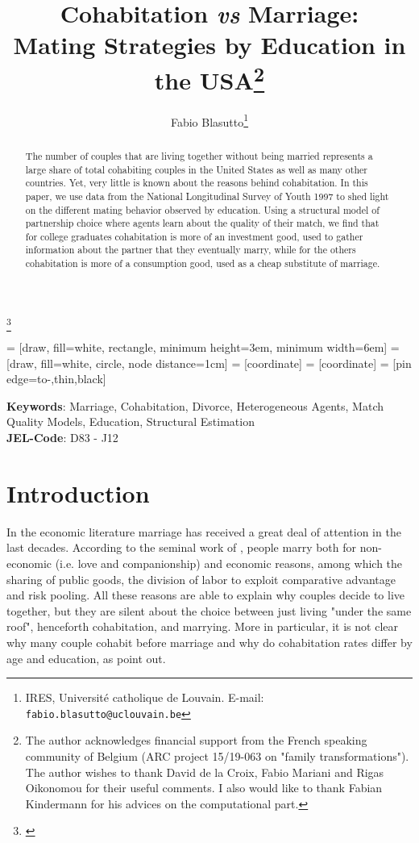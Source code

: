 \documentclass[12pt]{article}
\title{Cohabitation \textit{vs} Marriage:\\ Mating Strategies by Education in the USA\thanks{The author acknowledges financial support from the French speaking community of Belgium (ARC project 15/19-063 on "family transformations"). The author wishes to thank David de la Croix, Fabio Mariani and Rigas Oikonomou for their useful comments. I also would like to thank Fabian Kindermann for his advices on the computational part.}}
\author{Fabio Blasutto\thanks{IRES, Université catholique de Louvain. E-mail: \tt{fabio.blasutto@uclouvain.be}}}
\begin{document}
 \begin{spacing}{1.5}
 \lipsum*[1]\footnote{\begin{spacing}{1.5}\lipsum[1]\end{spacing}}
\end{spacing}
 	 = [draw, fill=white, rectangle, 
 	minimum height=3em, minimum width=6em]
 	 = [draw, fill=white, circle, node distance=1cm]
 	 = [coordinate]
 	 = [coordinate]
 	 = [pin edge={to-,thin,black}]
 	



	\maketitle
\begin{abstract}
The number of couples that are living together without being married represents a large share of total cohabiting couples in the United States as well as many other countries. Yet, very little is known about the reasons behind cohabitation. In this paper, we use data from the National Longitudinal Survey of Youth 1997 to shed light on the different mating behavior observed by education. Using a structural model of partnership choice where agents learn about the quality of their match, we find that for college graduates cohabitation is more of an investment good, used to gather information about the partner that they eventually marry, while for the others cohabitation is more of a consumption good, used as a cheap substitute of marriage.
\end{abstract}
\textbf{Keywords}: Marriage, Cohabitation, Divorce, Heterogeneous Agents, Match Quality Models,  Education, Structural Estimation\\
\textbf{JEL-Code}: D83 - J12 
\clearpage
\noindent \medskip{}
\section{Introduction}
In the economic literature marriage has received a great deal of attention in the last decades. According to the seminal work of \citet{becker1981}, people marry both for non-economic (i.e. love and companionship) and economic reasons, among which the sharing of public goods, the division of labor to exploit comparative advantage and risk pooling.
All these reasons are able to explain why couples decide to live together, but they are silent about the choice between just living "under the same roof", henceforth cohabitation, and marrying. More in particular, it is not clear why many couple cohabit before marriage and why do cohabitation rates differ by age and education, as \citet{perelli2016} point out.
\end{document}
